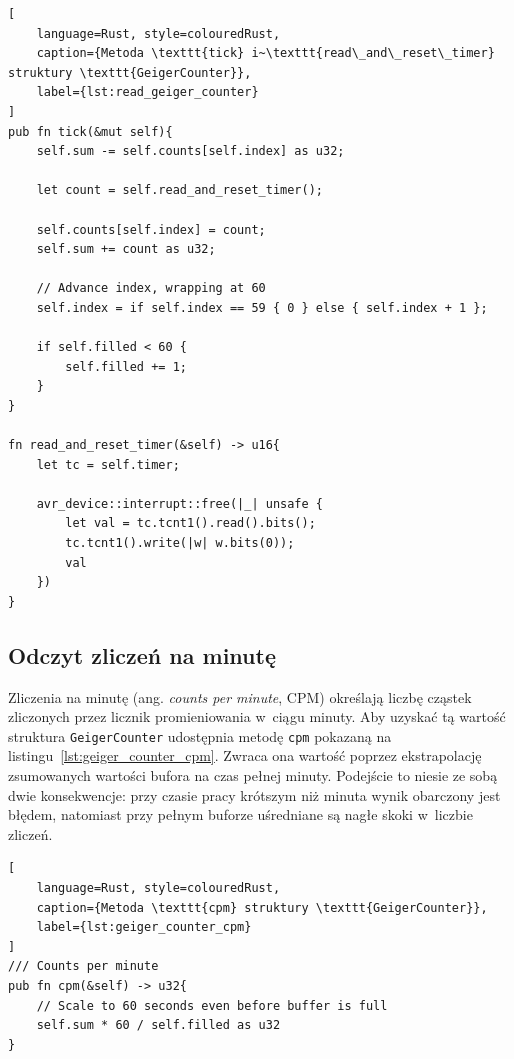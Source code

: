 \begin{lstlisting}[
    language=Rust, style=colouredRust, 
    caption={Metoda \texttt{tick} i~\texttt{read\_and\_reset\_timer} struktury \texttt{GeigerCounter}},
    label={lst:read_geiger_counter}
]
pub fn tick(&mut self){
    self.sum -= self.counts[self.index] as u32;

    let count = self.read_and_reset_timer();

    self.counts[self.index] = count;
    self.sum += count as u32;

    // Advance index, wrapping at 60
    self.index = if self.index == 59 { 0 } else { self.index + 1 };

    if self.filled < 60 {
        self.filled += 1;
    }
}

fn read_and_reset_timer(&self) -> u16{
    let tc = self.timer;

    avr_device::interrupt::free(|_| unsafe {
        let val = tc.tcnt1().read().bits();
        tc.tcnt1().write(|w| w.bits(0));
        val
    })
}
\end{lstlisting}

\subsection*{Odczyt zliczeń na minutę}
Zliczenia na minutę (ang. \textit{counts per minute}, CPM) określają liczbę 
cząstek zliczonych przez licznik promieniowania w~ciągu minuty.
Aby uzyskać tą wartość struktura \texttt{GeigerCounter} udostępnia
metodę \texttt{cpm} pokazaną na listingu~\ref{lst:geiger_counter_cpm}.
Zwraca ona wartość poprzez ekstrapolację zsumowanych wartości bufora na czas
pełnej minuty. Podejście to niesie ze sobą dwie konsekwencje: przy czasie pracy 
krótszym niż minuta wynik obarczony jest błędem, natomiast przy pełnym buforze
uśredniane są nagłe skoki w~liczbie zliczeń.

\begin{lstlisting}[
    language=Rust, style=colouredRust, 
    caption={Metoda \texttt{cpm} struktury \texttt{GeigerCounter}},
    label={lst:geiger_counter_cpm}
]
/// Counts per minute
pub fn cpm(&self) -> u32{
    // Scale to 60 seconds even before buffer is full
    self.sum * 60 / self.filled as u32
}
\end{lstlisting}
